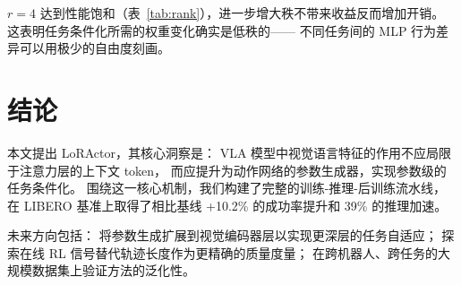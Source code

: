 \documentclass[10pt,twocolumn]{ctexart}
\begin{document}
$r=4$ 达到性能饱和（表~\ref{tab:rank}），进一步增大秩不带来收益反而增加开销。
这表明任务条件化所需的权重变化确实是低秩的——
不同任务间的 MLP 行为差异可以用极少的自由度刻画。

\section{结论}

本文提出 LoRActor，其核心洞察是：
VLA 模型中视觉语言特征的作用不应局限于注意力层的上下文 token，
而应提升为动作网络的参数生成器，实现参数级的任务条件化。
围绕这一核心机制，我们构建了完整的训练-推理-后训练流水线，
在 LIBERO 基准上取得了相比基线 +10.2\% 的成功率提升和 39\% 的推理加速。

未来方向包括：
将参数生成扩展到视觉编码器层以实现更深层的任务自适应；
探索在线 RL 信号替代轨迹长度作为更精确的质量度量；
在跨机器人、跨任务的大规模数据集上验证方法的泛化性。
\end{document}
